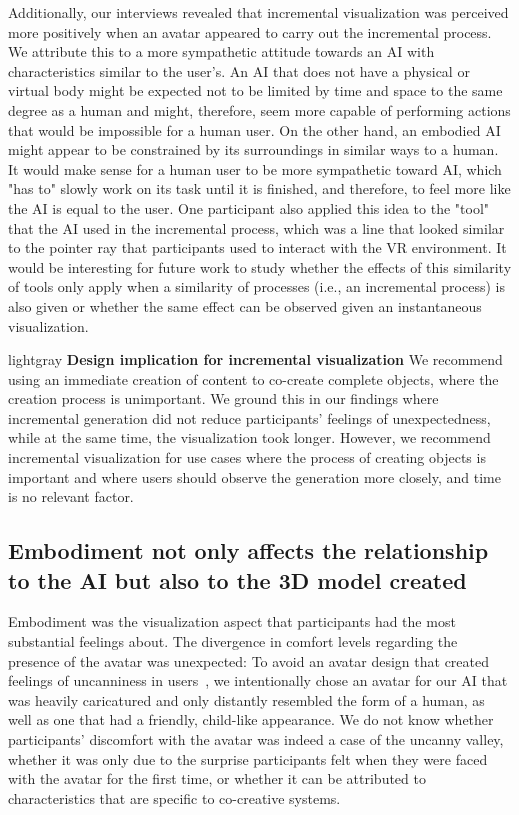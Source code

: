Additionally, our interviews revealed that incremental visualization was perceived more positively when an avatar appeared to carry out the incremental process. We attribute this to a more sympathetic attitude towards an AI with characteristics similar to the user's. An AI that does not have a physical or virtual body might be expected not to be limited by time and space to the same degree as a human and might, therefore, seem more capable of performing actions that would be impossible for a human user. On the other hand, an embodied AI might appear to be constrained by its surroundings in similar ways to a human. It would make sense for a human user to be more sympathetic toward AI, which "has to" slowly work on its task until it is finished, and therefore, to feel more like the AI is equal to the user. One participant also applied this idea to the "tool" that the AI used in the incremental process, which was a line that looked similar to the pointer ray that participants used to interact with the VR environment. It would be interesting for future work to study whether the effects of this similarity of tools only apply when a similarity of processes (i.e., an incremental process) is also given or whether the same effect can be observed given an instantaneous visualization. 


\begin{leftbar}{lightgray}
    \noindent \textbf{Design implication for incremental visualization}\quad
    We recommend using an immediate creation of content to co-create complete objects, where the creation process is unimportant. We ground this in our findings where incremental generation did not reduce participants' feelings of unexpectedness, while at the same time, the visualization took longer. However, we recommend incremental visualization for use cases where the process of creating objects is important and where users should observe the generation more closely, and time is no relevant factor.
\end{leftbar}  

\subsection{Embodiment not only affects the relationship to the AI but also to the 3D model created}
Embodiment was the visualization aspect that participants had the most substantial feelings about. The divergence in comfort levels regarding the presence of the avatar was unexpected: To avoid an avatar design that created feelings of uncanniness in users~\cite{mori_uncanny_2012}, we intentionally chose an avatar for our AI that was heavily caricatured and only distantly resembled the form of a human, as well as one that had a friendly, child-like appearance. We do not know whether participants' discomfort with the avatar was indeed a case of the uncanny valley, whether it was only due to the surprise participants felt when they were faced with the avatar for the first time, or whether it can be attributed to characteristics that are specific to co-creative systems. 

